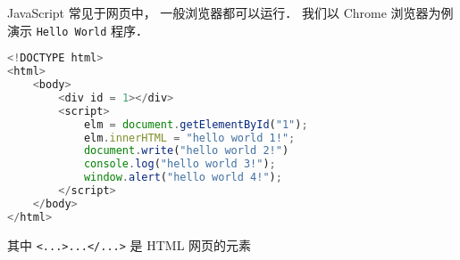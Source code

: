 
JavaScript 常见于网页中， 一般浏览器都可以运行． 我们以 Chrome 浏览器为例演示 \verb|Hello World| 程序．

\begin{lstlisting}[language=js]
<!DOCTYPE html>
<html>
	<body>
		<div id = 1></div>
		<script>
			elm = document.getElementById("1");
   			elm.innerHTML = "hello world 1!";
			document.write("hello world 2!")
			console.log("hello world 3!");
			window.alert("hello world 4!");
		</script>
	</body>
</html>
\end{lstlisting}
其中 \verb|<...>...</...>| 是 HTML 网页的元素
